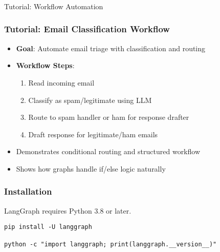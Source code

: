 \begin{frame}[fragile]\frametitle{}
\begin{center}
{\Large Tutorial: Workflow Automation}
\end{center}
\end{frame}



\begin{frame}[fragile]\frametitle{Tutorial: Email Classification Workflow}
      \begin{itemize}
        \item \textbf{Goal}: Automate email triage with classification and routing
        \item \textbf{Workflow Steps}:
        \begin{enumerate}
            \item Read incoming email
            \item Classify as spam/legitimate using LLM
            \item Route to spam handler or ham for response drafter
            \item Draft response for legitimate/ham emails
        \end{enumerate}
        \item Demonstrates conditional routing and structured workflow
        \item Shows how graphs handle if/else logic naturally
      \end{itemize}
\end{frame}

\begin{frame}[fragile]\frametitle{Installation}
LangGraph requires Python 3.8 or later. 

      \begin{lstlisting}
pip install -U langgraph

python -c "import langgraph; print(langgraph.__version__)"
      \end{lstlisting}
\end{frame}


